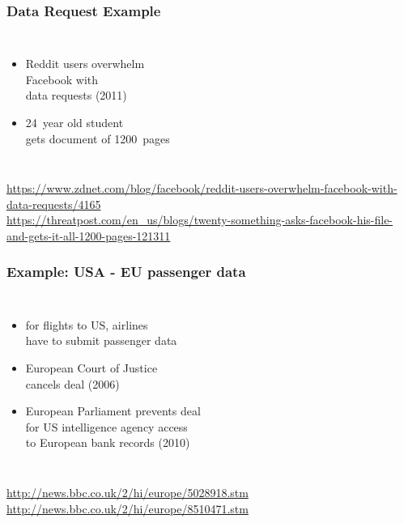 \documentclass[dvipsnames]{beamer}
\theoremstyle{plain}
\begin{document}
\begin{frame}
  \frametitle{Data Request Example}

  \begin{columns}

    \begin{itemize}
      \item Reddit users overwhelm\\
        Facebook with\\
        data requests (2011)
      \item 24~year old student\\
        gets document of 1200~pages
    \end{itemize}
  \end{columns}

  \medskip
  \tiny{\url{https://www.zdnet.com/blog/facebook/reddit-users-overwhelm-facebook-with-data-requests/4165}}\\
  \smallskip
  \tiny{\url{https://threatpost.com/en_us/blogs/twenty-something-asks-facebook-his-file-and-gets-it-all-1200-pages-121311}}\\
\end{frame}

\begin{frame}
  \frametitle{Example: USA - EU passenger data}

  \begin{columns}

    \begin{itemize}
      \item for flights to US, airlines\\
        have to submit passenger data
      \item European Court of Justice\\
        cancels deal (2006)

      \pause
      \medskip
      \item European Parliament prevents deal\\
        for US intelligence agency access\\
        to European bank records (2010)
    \end{itemize}
  \end{columns}

  \medskip
  \tiny{\url{http://news.bbc.co.uk/2/hi/europe/5028918.stm}}\\
  \smallskip
  \tiny{\url{http://news.bbc.co.uk/2/hi/europe/8510471.stm}}\\
\end{frame}
\end{document}
